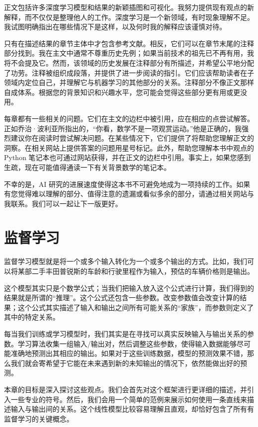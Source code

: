 \documentclass[lang=cn,newtx,10pt,scheme=chinese]{elegantbook}
\begin{document}
正文包括许多深度学习模型和结果的新颖插图和可视化。我努力提供现有观点的新解释，而不仅仅是整理他人的工作。深度学习是一个新领域，有时现象理解不足。我试图明确指出在哪些情况下是这样，以及何时我的解释应该谨慎对待。

只有在描述结果的章节主体中才包含参考文献。相反，它们可以在章节末尾的注释部分找到。我在主文中通常不尊重历史先例；如果当前技术的祖先已不再有用，我将不会提及它。然而，该领域的历史发展在注释部分有所描述，并希望公平地分配了功劳。注释被组织成段落，并提供了进一步阅读的指引。它们应该帮助读者在子领域内定位自己，并理解它与机器学习的其他部分的关系。注释部分不像正文那样自成体系。根据您的背景知识和兴趣水平，您可能会觉得这些部分更有用或更没用。

每章都有一些相关的问题。它们在主文的边栏中被引用，应在相应的点尝试解答。正如乔治·波利亚所指出的，“你看，数学不是一项观赏运动。”他是正确的，我强烈建议你在阅读时尝试解决问题。在某些情况下，它们提供了将帮助您理解正文的洞察。在相关网站上提供答案的问题用星号标记。此外，帮助您理解本书中观点的 Python 笔记本也可通过网站获得，并在正文的边栏中引用。事实上，如果您感到生疏，现在可能值得通读一下有关背景数学的笔记本。

不幸的是，AI 研究的进展速度使得这本书不可避免地成为一项持续的工作。如果有您觉得难以理解的部分、值得注意的遗漏或看似多余的部分，请通过相关网站与我联系。我们可以一起让下一版更好。

\chapter{监督学习}

监督学习模型就是将一个或多个输入转化为一个或多个输出的方式。比如，我们可以将某部二手丰田普锐斯的车龄和行驶里程作为输入，预估的车辆价格则是输出。

这个模型其实只是个数学公式；当我们把输入放入这个公式进行计算，我们得到的结果就是所谓的“推理”。这个公式还包含一些参数。改变参数值会改变计算的结果；这个公式其实描述了输入和输出之间所有可能关系的“家族”，而参数则定义了其中的特定关系。

每当我们训练或学习模型时，我们其实是在寻找可以真实反映输入与输出关系的参数。学习算法收集一组输入/输出对，然后调整这些参数，使得输入数据能够尽可能准确地预测出其相应的输出。如果对于这些训练数据，模型的预测效果不错，那么我们就会寄希望于它能在未来遇到新的未知输出的情况下，依然能做出好的预测。

本章的目标是深入探讨这些观点。我们会首先对这个框架进行更详细的描述，并引入一些专业的符号。然后，我们会用一个简单的范例来展示如何使用一条直线来描述输入与输出间的关系。这个线性模型比较容易理解且直观，却恰好包含了所有有监督学习的关键概念。
\end{document}
